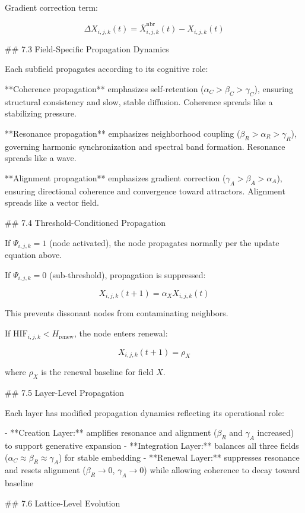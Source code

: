 Gradient correction term:

\[
\Delta X_{i,j,k}(t) = \overline{X}^{\text{nbr}}_{i,j,k}(t) - X_{i,j,k}(t)
\]

## 7.3 Field-Specific Propagation Dynamics

Each subfield propagates according to its cognitive role:

**Coherence propagation** emphasizes self-retention (\(\alpha_C > \beta_C > \gamma_C\)),
ensuring structural consistency and slow, stable diffusion. Coherence spreads like a
stabilizing pressure.

**Resonance propagation** emphasizes neighborhood coupling (\(\beta_R > \alpha_R >
\gamma_R\)), governing harmonic synchronization and spectral band formation.
Resonance spreads like a wave.

**Alignment propagation** emphasizes gradient correction (\(\gamma_A > \beta_A >
\alpha_A\)), ensuring directional coherence and convergence toward attractors.
Alignment spreads like a vector field.

## 7.4 Threshold-Conditioned Propagation

If \(\Psi_{i,j,k} = 1\) (node activated), the node propagates normally per the
update equation above.

If \(\Psi_{i,j,k} = 0\) (sub-threshold), propagation is suppressed:

\[
X_{i,j,k}(t+1) = \alpha_X X_{i,j,k}(t)
\]

This prevents dissonant nodes from contaminating neighbors.

If \(\mathrm{HIF}_{i,j,k} < H_{\text{renew}}\), the node enters renewal:

\[
X_{i,j,k}(t+1) = \rho_X
\]

where \(\rho_X\) is the renewal baseline for field \(X\).

## 7.5 Layer-Level Propagation

Each layer has modified propagation dynamics reflecting its operational role:

- **Creation Layer:** amplifies resonance and alignment (\(\beta_R\) and \(\gamma_A\)
  increased) to support generative expansion
- **Integration Layer:** balances all three fields (\(\alpha_C \approx \beta_R
  \approx \gamma_A\)) for stable embedding
- **Renewal Layer:** suppresses resonance and resets alignment (\(\beta_R
  \rightarrow 0\), \(\gamma_A \rightarrow 0\)) while allowing coherence to decay
  toward baseline

## 7.6 Lattice-Level Evolution


